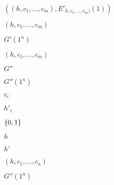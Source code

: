 \documentclass[10pt]{book}
\begin{document}
\begin{mdSnippets}
\begin{mdInlineSnippet}[a06785bf5ebe5ce1857c1e689eb57b16]%
$((h,c_1,\ldots,c_m),E'_{h,c_1,\ldots,c_m)}(1))$\end{mdInlineSnippet}%
\begin{mdInlineSnippet}[07480fbe062a699c3f8a9b574d1c0005]%
$(h,c_1,\ldots,c_m)$\end{mdInlineSnippet}%
\begin{mdInlineSnippet}[e19042d5663b539464ba4dfc81324712]%
$G'(1^n)$\end{mdInlineSnippet}%
\begin{mdInlineSnippet}[07480fbe062a699c3f8a9b574d1c0005]%
$(h,c_1,\ldots,c_m)$\end{mdInlineSnippet}%
\begin{mdInlineSnippet}[6605946909b77db5a5b36d9bdde73d35]%
$G''$\end{mdInlineSnippet}%
\begin{mdInlineSnippet}[5d36c941733c33c291ab9d3e71166464]%
$G''(1^n)$\end{mdInlineSnippet}%
\begin{mdInlineSnippet}[96fafac0c054b9eb47d3f630ed02c289]%
$c_i$\end{mdInlineSnippet}%
\begin{mdInlineSnippet}[b45ae92f9026a9873bdf718041128191]%
$h'_i$\end{mdInlineSnippet}%
\begin{mdInlineSnippet}[69d364206d67dcdb68878f093fc16950]%
$\{0,1\}$\end{mdInlineSnippet}%
\begin{mdInlineSnippet}[2510c39011c5be704182423e3a695e91]%
$h$\end{mdInlineSnippet}%
\begin{mdInlineSnippet}[b86b0594d40397704d608adb70701c37]%
$h'$\end{mdInlineSnippet}%
\begin{mdInlineSnippet}[729d513e1df5d76359b0a671a4e16af8]%
$(h,c_1,\ldots,c_n)$\end{mdInlineSnippet}%
\begin{mdInlineSnippet}[5d36c941733c33c291ab9d3e71166464]%
$G''(1^n)$\end{mdInlineSnippet}%

\end{mdSnippets}
\end{document}
